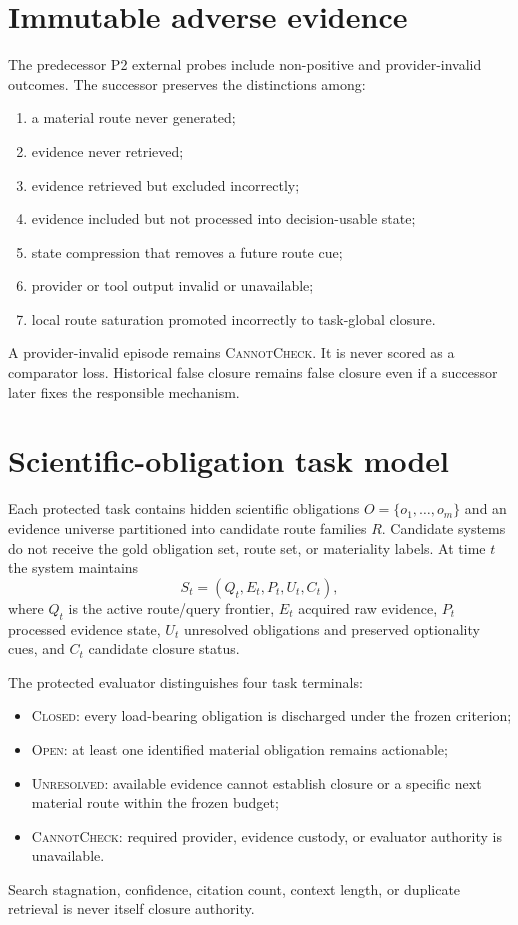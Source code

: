 \documentclass[11pt]{article}
\begin{document}
\section{Immutable adverse evidence}
The predecessor P2 external probes include non-positive and provider-invalid outcomes. The successor preserves the distinctions among:
\begin{enumerate}
    \item a material route never generated;
    \item evidence never retrieved;
    \item evidence retrieved but excluded incorrectly;
    \item evidence included but not processed into decision-usable state;
    \item state compression that removes a future route cue;
    \item provider or tool output invalid or unavailable;
    \item local route saturation promoted incorrectly to task-global closure.
\end{enumerate}
A provider-invalid episode remains \textsc{CannotCheck}. It is never scored as a comparator loss. Historical false closure remains false closure even if a successor later fixes the responsible mechanism.

\section{Scientific-obligation task model}
Each protected task contains hidden scientific obligations $O=\{o_1,\ldots,o_m\}$ and an evidence universe partitioned into candidate route families $R$. Candidate systems do not receive the gold obligation set, route set, or materiality labels. At time $t$ the system maintains
\[
S_t=(Q_t,E_t,P_t,U_t,C_t),
\]
where $Q_t$ is the active route/query frontier, $E_t$ acquired raw evidence, $P_t$ processed evidence state, $U_t$ unresolved obligations and preserved optionality cues, and $C_t$ candidate closure status.

The protected evaluator distinguishes four task terminals:
\begin{itemize}
    \item \textsc{Closed}: every load-bearing obligation is discharged under the frozen criterion;
    \item \textsc{Open}: at least one identified material obligation remains actionable;
    \item \textsc{Unresolved}: available evidence cannot establish closure or a specific next material route within the frozen budget;
    \item \textsc{CannotCheck}: required provider, evidence custody, or evaluator authority is unavailable.
\end{itemize}
Search stagnation, confidence, citation count, context length, or duplicate retrieval is never itself closure authority.
\end{document}
